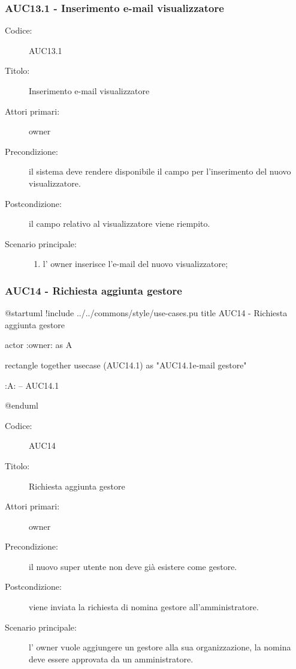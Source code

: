 \documentclass[casi-duso]{subfiles}
\begin{document}
\subsubsection{AUC13.1 - Inserimento e-mail visualizzatore}%
\label{subsub:AUC13.1}
\begin{description}
  \item[Codice:] AUC13.1
  \item[Titolo:] Inserimento e-mail visualizzatore
  \item[Attori primari:] owner
  \item[Precondizione:] il sistema deve rendere disponibile il campo per l'inserimento del nuovo visualizzatore.
  \item[Postcondizione:] il campo relativo al visualizzatore viene riempito.
  \item[Scenario principale:] 
  \begin{enumerate}
    \item l' owner inserisce l'e-mail del nuovo visualizzatore;
  \end{enumerate}
\end{description}

\subsubsection{AUC14 - Richiesta aggiunta gestore}%
\label{subsub:AUC14}

\begin{plantuml}
@startuml
!include ../../commons/style/use-cases.pu
title AUC14 - Richiesta aggiunta gestore

actor :owner: as A

rectangle {
  together {
    usecase (AUC14.1) as "AUC14.1\nInserimento e-mail gestore"
  }
}

:A: -- AUC14.1

@enduml
\end{plantuml}

\begin{description}
  \item[Codice:] AUC14
  \item[Titolo:] Richiesta aggiunta gestore
  \item[Attori primari:] owner
  \item[Precondizione:] il nuovo super utente non deve già esistere come gestore.
  \item[Postcondizione:] viene inviata la richiesta di nomina gestore all'amministratore.
  \item[Scenario principale:] l' owner vuole aggiungere un gestore alla sua organizzazione, la nomina deve essere approvata da un 
  amministratore.
\end{description}
\end{document}
